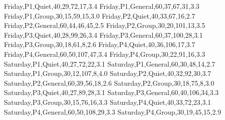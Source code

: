 {Friday,P1,Quiet,40,29,72,17,3.4
Friday,P1,General,60,37,67,31,3.3
Friday,P1,Group,30,15,59,15,3.0
Friday,P2,Quiet,40,33,67,16,2.7
Friday,P2,General,60,44,46,45,2.5
Friday,P2,Group,30,20,101,13,3.5
Friday,P3,Quiet,40,28,99,26,3.4
Friday,P3,General,60,37,100,28,3.1
Friday,P3,Group,30,18,61,8,2.6
Friday,P4,Quiet,40,36,106,17,3.7
Friday,P4,General,60,50,107,47,3.4
Friday,P4,Group,30,22,91,16,3.3
Saturday,P1,Quiet,40,27,72,22,3.1
Saturday,P1,General,60,30,48,14,2.7
Saturday,P1,Group,30,12,107,8,4.0
Saturday,P2,Quiet,40,32,92,30,3.7
Saturday,P2,General,60,39,56,18,2.6
Saturday,P2,Group,30,18,75,8,3.0
Saturday,P3,Quiet,40,27,89,28,3.1
Saturday,P3,General,60,40,106,34,3.3
Saturday,P3,Group,30,15,76,16,3.3
Saturday,P4,Quiet,40,33,72,23,3.1
Saturday,P4,General,60,50,108,29,3.3
Saturday,P4,Group,30,19,45,15,2.9
}\librarydata